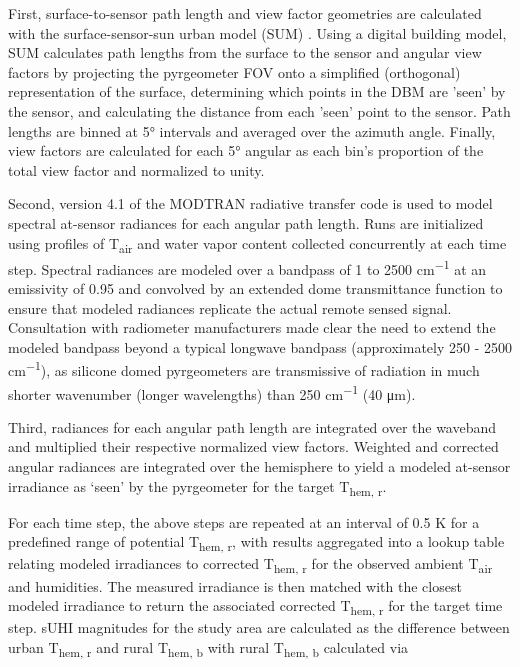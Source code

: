 First, surface-to-sensor path length and view factor geometries are calculated with the surface-sensor-sun urban model (SUM) \citep{Soux2004}. Using a digital building model, SUM calculates path lengths from the surface to the sensor and angular view factors by projecting the pyrgeometer FOV onto a simplified (orthogonal) representation of the surface, determining which points in the DBM are 'seen' by the sensor, and calculating the distance from each 'seen' point to the sensor. Path lengths are binned at 5\si{\degree} intervals and averaged over the azimuth angle. Finally, view factors are calculated for each 5\si{\degree} angular as each bin's proportion of the total view factor and normalized to unity.

Second, version 4.1 of the MODTRAN radiative transfer code \citep{Berk1987} is used to model spectral at-sensor radiances for each angular path length. Runs are initialized using profiles of T\textsubscript{air} and water vapor content collected concurrently at each time step. Spectral radiances are modeled over a bandpass of 1 to 2500 \si{cm^{-1}} at an emissivity of 0.95 and convolved by an extended dome transmittance function to ensure that modeled radiances replicate the actual remote sensed signal. Consultation with radiometer manufacturers made clear the need to extend the modeled bandpass beyond a typical longwave bandpass (approximately 250 - 2500 \si{cm^{-1}}), as silicone domed pyrgeometers are transmissive of radiation in much shorter wavenumber (longer wavelengths) than 250 \si{cm^{-1}} (40 \si{\micro\meter}).

Third, radiances for each angular path length are integrated over the waveband and multiplied their respective normalized view factors. Weighted and corrected angular radiances are integrated over the hemisphere to yield a modeled at-sensor irradiance as ‘seen’ by the pyrgeometer for the target T\textsubscript{hem, r}. 

For each time step, the above steps are repeated at an interval of 0.5 \si{\kelvin} for a predefined range of potential T\textsubscript{hem, r}, with results aggregated into a lookup table relating modeled irradiances to corrected T\textsubscript{hem, r} for the observed ambient T\textsubscript{air} and humidities. The measured irradiance is then matched with the closest modeled irradiance to return the associated corrected T\textsubscript{hem, r} for the target time step. sUHI magnitudes for the study area are calculated as the difference between urban T\textsubscript{hem, r} and rural T\textsubscript{hem, b} with rural T\textsubscript{hem, b} calculated via


